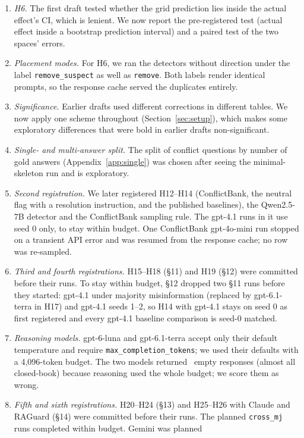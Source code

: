\begin{enumerate}[leftmargin=*,itemsep=1pt,topsep=2pt]
\item \emph{H6.} The first draft tested whether the grid prediction lies inside the actual effect's CI, which is
lenient. We now report the pre-registered test (actual effect inside a bootstrap prediction interval) and a paired test
of the two spaces' errors.
\item \emph{Placement modes.} For H6, we ran the detectors without direction under the label
\texttt{remove\_suspect} as well as \texttt{remove}. Both labels render identical prompts, so the response cache served the
duplicates entirely.
\item \emph{Significance.} Earlier drafts used different corrections in different tables. We now apply one scheme
throughout (Section~\ref{sec:setup}), which makes some exploratory differences that were bold in earlier drafts
non-significant.
\item \emph{Single- and multi-answer split.} The split of conflict questions by number of gold answers
(Appendix~\ref{app:single}) was chosen after seeing the minimal-skeleton run and is exploratory.
\item \emph{Second registration.} We later registered H12--H14 (ConflictBank, the neutral flag with a
resolution instruction, and the published baselines), the Qwen2.5-7B detector and the ConflictBank sampling rule.
The gpt-4.1 runs in it use seed 0 only, to stay within budget. One ConflictBank gpt-4o-mini run stopped on a
transient API error and was resumed from the response cache; no row was re-sampled.
\item \emph{Third and fourth registrations.} H15--H18 (\S11) and H19 (\S12) were committed before their runs. To stay
within budget, \S12 dropped two \S11 runs before they started: gpt-4.1 under majority misinformation (replaced by
gpt-6.1-terra in H17) and gpt-4.1 seeds 1--2, so H14 with gpt-4.1 stays on seed 0 as first registered and every
gpt-4.1 baseline comparison is seed-0 matched.
\item \emph{Reasoning models.} gpt-6-luna and gpt-6.1-terra accept only their default temperature and require
\texttt{max\_completion\_tokens}; we used their defaults with a 4,096-token budget. The two models returned
\Nempty\ empty responses (almost all closed-book) because reasoning used the whole budget; we score them as wrong.
\item \emph{Fifth and sixth registrations.} H20--H24 (\S13) and H25--H26 with Claude and RAGuard (\S14) were
committed before their runs. The planned \texttt{cross\_mj} runs completed within budget. Gemini was planned

\end{enumerate}
